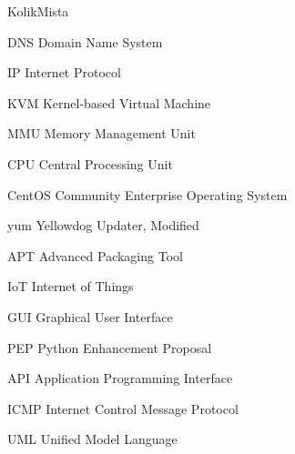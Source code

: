 \begin{seznamzkratek}{KolikMista}

		{DNS}
		{Domain Name System}
		
		{IP}
		{Internet Protocol}
		
		{KVM}
		{Kernel-based Virtual Machine}
		
		{MMU}
		{Memory Management Unit}
		
		{CPU}
		{Central Processing Unit}
		
		{CentOS}
		{Community Enterprise Operating System}


		{yum}
		{Yellowdog Updater, Modified}

		{APT}
		{Advanced Packaging Tool}
		
		{IoT}
		{Internet of Things}

		{GUI}
		{Graphical User Interface}
		
		{PEP}
		{Python Enhancement Proposal}	
		
		{API}
		{Application Programming Interface}		
		
		{ICMP}
		{Internet Control Message Protocol}				

		{UML}
		{Unified Model Language}		
		

\end{seznamzkratek}
